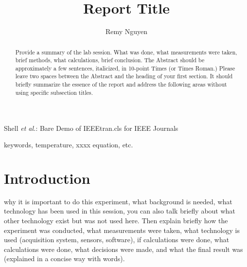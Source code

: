 \documentclass[journal]{IEEEtran}
\begin{document}
\title{Report Title} %

\author{Remy Nguyen
    }%
        
{Shell \MakeLowercase{\textit{et al.}}: Bare Demo of IEEEtran.cls for IEEE Journals}

\maketitle

\begin{abstract}
Provide a summary of the lab session. What was done, 
what measurements were taken, brief methods, what calculations, brief conclusion.  The Abstract should be approximately a few sentences, italicized, in 10-point Times (or Times Roman.) Please leave two spaces between the Abstract and the heading of your first section.
It should briefly summarize the essence of the report and address the following areas without using specific subsection titles. 
\end{abstract}

\begin{IEEEkeywords} %
keywords, temperature, xxxx equation, etc.
\end{IEEEkeywords}

\section{Introduction}

 why it is important to do this experiment, what background is needed, what technology has been used in this session, you can also talk briefly about what other technology exist but was not used here.
Then explain briefly how the experiment was conducted, what measurements were taken, what technology is used (acquisition system, sensors, software), if calculations were done, what calculations were done, what decisions were made, and what the final result was (explained in a concise way with words).
\end{document}
